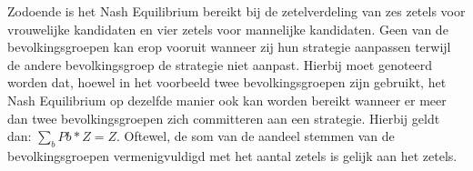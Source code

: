Zodoende is het Nash Equilibrium bereikt bij de zetelverdeling van zes zetels voor vrouwelijke kandidaten en vier zetels voor mannelijke kandidaten. Geen van de bevolkingsgroepen kan erop vooruit wanneer zij hun strategie aanpassen terwijl de andere bevolkingsgroep de strategie niet aanpast. Hierbij moet genoteerd worden dat, hoewel in het voorbeeld twee bevolkingsgroepen zijn gebruikt, het Nash Equilibrium op dezelfde manier ook kan worden bereikt wanneer er meer dan twee bevolkingsgroepen zich committeren aan een strategie. Hierbij geldt dan: $\sum_{b} P{b} * Z = Z$. Oftewel, de som van de aandeel stemmen van de bevolkingsgroepen vermenigvuldigd met het aantal zetels is gelijk aan het zetels.




 
